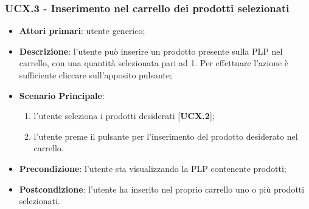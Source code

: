 \subsubsection{UCX.3 - Inserimento nel carrello dei prodotti selezionati}
\begin{itemize}
\item \textbf{Attori primari}: utente generico;
\item \textbf{Descrizione}: l'utente può inserire un prodotto presente sulla PLP nel carrello, con una quantità selezionata pari ad 1. Per effettuare l'azione è sufficiente cliccare sull'apposito pulsante;
\item \textbf{Scenario Principale}:
\begin{enumerate}
\item l'utente seleziona i prodotti desiderati [\textbf{UCX.2}];
\item l'utente preme il pulsante per l'inserimento del prodotto desiderato nel carrello.
\end{enumerate}
\item \textbf{Precondizione}: l'utente sta visualizzando la PLP contenente prodotti;
\item \textbf{Postcondizione}: l'utente ha inserito nel proprio carrello uno o più prodotti selezionati.
\end{itemize}
